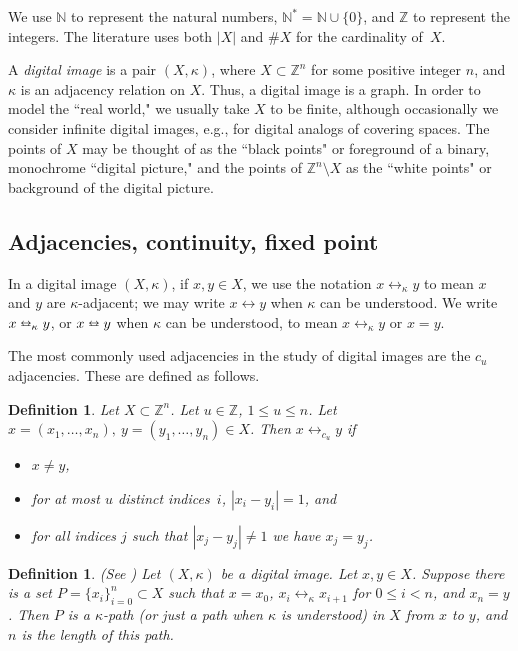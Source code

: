 \documentclass{article}
\newtheorem{definition}[thm]{Definition}
\numberwithin{thm}{section}
\newcommand{\adj}{\leftrightarrow}
\newcommand{\adjeq}{\leftrightarroweq}
\def\Z{{\mathbb Z}}
\def\N{{\mathbb N}}
\def\R{{\mathbb R}}
\begin{document}
We use $\N$ to represent the natural numbers,
$\N^* = \N \cup \{0\}$, and
$\Z$ to represent the integers. 
The literature uses both $|X|$
and $\#X$ for the cardinality of~$X$. 

A {\em digital image} is a pair $(X,\kappa)$, where $X \subset \Z^n$ 
for some positive integer $n$, and $\kappa$ is an adjacency relation on $X$. 
Thus, a digital image is a graph.
In order to model the ``real world," we usually take $X$ to be finite,
although occasionally we consider
infinite digital images, e.g., for digital analogs of
covering spaces. The points of $X$ may be 
thought of as the ``black points" or foreground of a 
binary, monochrome ``digital picture," and the 
points of $\Z^n \setminus X$ as the ``white points"
or background of the digital picture.

\subsection{Adjacencies, 
continuity, fixed point}

In a digital image $(X,\kappa)$, if
$x,y \in X$, we use the notation
$x \adj_{\kappa}y$ to
mean $x$ and $y$ are $\kappa$-adjacent; we may write
$x \adj y$ when $\kappa$ can be understood. 
We write $x \adjeq_{\kappa}y$, or $x \adjeq y$
when $\kappa$ can be understood, to
mean 
$x \adj_{\kappa}y$ or $x=y$.

The most commonly used adjacencies in the study of digital images 
are the $c_u$ adjacencies. These are defined as follows.
\begin{definition}
\label{cu-adj-Def}
Let $X \subset \Z^n$. Let $u \in \Z$, $1 \le u \le n$. Let 
$x=(x_1, \ldots, x_n),~y=(y_1,\ldots,y_n) \in X$. Then $x \adj_{c_u} y$ if 
\begin{itemize}
    \item $x \neq y$,
    \item for at most $u$ distinct indices~$i$,
    $|x_i - y_i| = 1$, and
    \item for all indices $j$ such that $|x_j - y_j| \neq 1$ we have $x_j=y_j$.
\end{itemize}
\end{definition}

\begin{definition}
\label{path}
{\rm (See \cite{Khalimsky})} 
    Let $(X,\kappa)$ be a digital image. Let
    $x,y \in X$. Suppose there is a set
    $P = \{x_i\}_{i=0}^n \subset X$ such that
$x=x_0$, $x_i \adj_{\kappa} x_{i+1}$ for
$0 \le i < n$, and $x_n=y$. Then $P$ is a
{\em $\kappa$-path} (or just a {\em path}
when $\kappa$ is understood) in $X$ from $x$ to $y$,
and $n$ is the {\em length} of this path.
\end{definition}
\end{document}
